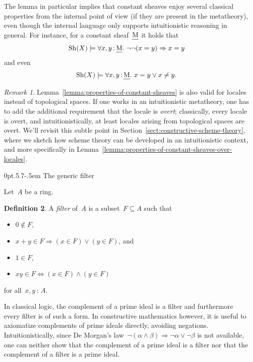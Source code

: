 \documentclass[10pt,reqno,a4paper]{amsbook}
\makeatletter
\theoremstyle{definition}
\newtheorem{defn}{Definition}[section]
\theoremstyle{plain}
\theoremstyle{remark}
\newtheorem{rem}[defn]{Remark}
\let\oldul\ul
\renewcommand{\ul}[1]{\text{\oldul{$#1$}}}
\newcommand{\Sh}{\mathrm{Sh}}
\newcommand{\?}{\,{:}\,}
\renewcommand{\_}{\mathpunct{.}\,}
\def\subsection{\@startsection{subsection}{2}%
  {0pt}{.5\linespacing\@plus.7\linespacing}{-.5em}%
  {\normalfont\bfseries}}
\makeatother
\begin{document}
The lemma in particular implies that constant sheaves enjoy several
classical properties from the internal point of view (if they are present in the metatheory), even though the internal
language only supports intuitionistic reasoning in general. For instance, for a
constant sheaf~$\ul{M}$ it holds that
\[ \Sh(X) \models \forall x,y\?\ul{M}\_ \neg\neg(x = y) \Rightarrow x = y \]
and even
\[ \Sh(X) \models \forall x,y\?\ul{M}\_ x = y \vee x \neq y. \]

\begin{rem}Lemma~\ref{lemma:properties-of-constant-sheaves} is also valid for
locales instead of topological spaces. If one works in an intuitionistic
metatheory, one has to add the additional requirement that the locale is
\emph{overt}; classically, every locale is overt, and intuitionistically,
at least locales arising from topological spaces are overt. We'll revisit this
subtle point in Section~\ref{sect:constructive-scheme-theory}, where we sketch
how scheme theory can be developed in an intuitionistic context, and more
specifically in Lemma~\ref{lemma:properties-of-constant-sheaves-over-locales}.
\end{rem}


\subsection{The generic filter}
\label{sect:generic-filter}

Let~$A$ be a ring.

\begin{defn}\label{defn:filter}
A \emph{filter} of~$A$ is a subset~$F \subseteq A$ such that
\begin{itemize}
\item $0 \not\in F$,
\item $x + y \in F \Longrightarrow (x \in F) \vee (y \in F)$, and
\item $1 \in F$,
\item $xy \in F \Longleftrightarrow (x \in F) \wedge (y \in F)$
\end{itemize}
for all~$x,y \? A$.
\end{defn}

In classical logic, the complement of a prime ideal is a filter and
furthermore every filter is of such a form. In constructive mathematics however,
it is useful to axiomatize complements of prime ideals directly, avoiding
negations. Intuitionistically, since De Morgan's law~$\neg(\alpha \wedge \beta)
\Rightarrow \neg\alpha \vee \neg\beta$ is not available, one can neither show
that the complement of a prime ideal is a filter nor that the complement of a
filter is a prime ideal.
\end{document}
